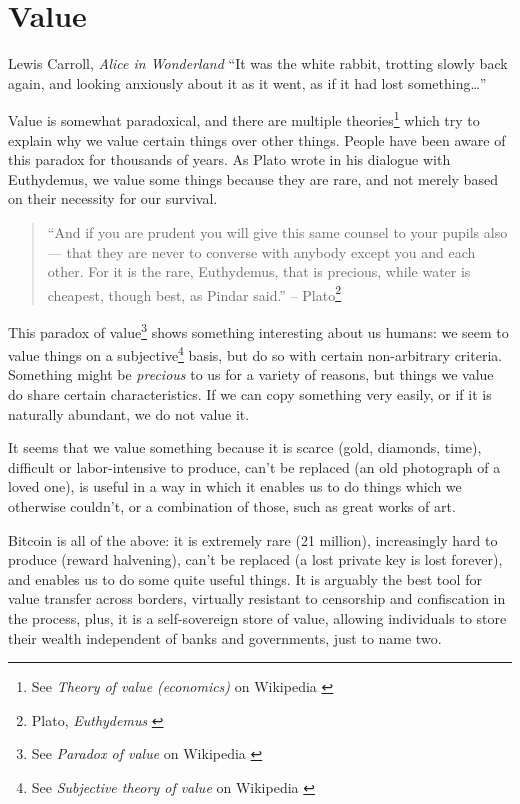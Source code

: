 \chapter{Value}
\label{les:10}

\begin{chapquote}{Lewis Carroll, \textit{Alice in Wonderland}}
``It was the white rabbit, trotting slowly back again, and looking anxiously
about it as it went, as if it had lost something\ldots''
\end{chapquote}

Value is somewhat paradoxical, and there are multiple theories\footnote{See
\textit{Theory of value (economics)} on Wikipedia \cite{wiki:theory-of-value}}
which try to explain why we value certain things over other things. People have
been aware of this paradox for thousands of years. As Plato wrote in his
dialogue with Euthydemus, we value some things because they are rare, and not
merely based on their necessity for our survival.

\begin{samepage}\begin{quotation}
``And if you are prudent you will give this same counsel to your pupils
also --- that they are never to converse with anybody except you and
each other. For it is the rare, Euthydemus, that is precious, while
water is cheapest, though best, as Pindar said.''
\flushright -- Plato\footnote{Plato, \textit{Euthydemus} \cite{euthydemus}}
\end{quotation}\end{samepage}

This paradox of value\footnote{See \textit{Paradox of value} on Wikipedia
\cite{wiki:paradox-of-value}} shows something interesting about us humans: we
seem to value things on a subjective\footnote{See \textit{Subjective theory of value} on Wikipedia \cite{wiki:subjective-theory-of-value}} basis, but do so with certain
non-arbitrary criteria. Something might be \textit{precious} to us for a variety
of reasons, but things we value do share certain characteristics. If we can copy
something very easily, or if it is naturally abundant, we do not value it.

It seems that we value something because it is scarce (gold, diamonds,
time), difficult or labor-intensive to produce, can't be replaced (an
old photograph of a loved one), is useful in a way in which it enables
us to do things which we otherwise couldn't, or a combination of those,
such as great works of art.

Bitcoin is all of the above: it is extremely rare (21 million),
increasingly hard to produce (reward halvening), can't be replaced (a
lost private key is lost forever), and enables us to do some quite
useful things. It is arguably the best tool for value transfer across
borders, virtually resistant to censorship and confiscation in the
process, plus, it is a self-sovereign store of value, allowing
individuals to store their wealth independent of banks and governments,
just to name two.

